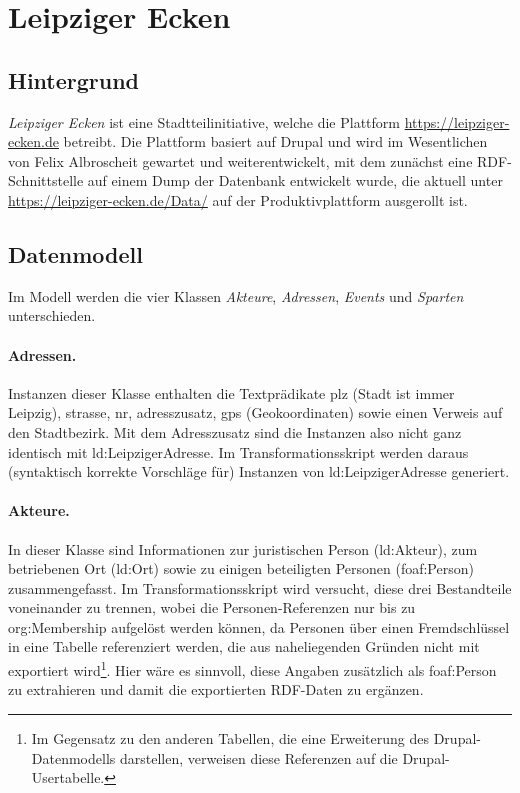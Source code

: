 \documentclass[a4paper,11pt]{article}
\begin{document}
\section{Leipziger Ecken}
\subsection{Hintergrund}

\emph{Leipziger Ecken} ist eine Stadtteilinitiative, welche die Plattform
\url{https://leipziger-ecken.de} betreibt. Die Plattform basiert auf Drupal
und wird im Wesentlichen von Felix Albroscheit gewartet und weiterentwickelt,
mit dem zunächst eine RDF-Schnittstelle auf einem Dump der Datenbank
entwickelt wurde, die aktuell unter \url{https://leipziger-ecken.de/Data/} auf
der Produktivplattform ausgerollt ist. 

\subsection{Datenmodell}

Im Modell werden die vier Klassen \emph{Akteure}, \emph{Adressen},
\emph{Events} und \emph{Sparten} unterschieden.

\paragraph{Adressen.}
Instanzen dieser Klasse enthalten die Textprädikate plz (Stadt ist immer
Leipzig), strasse, nr, adresszusatz, gps (Geokoordinaten) sowie einen Verweis
auf den Stadtbezirk.  Mit dem Adresszusatz sind die Instanzen also nicht ganz
identisch mit ld:LeipzigerAdresse. Im Transformationsskript werden daraus
(syntaktisch korrekte Vorschläge für) Instanzen von ld:LeipzigerAdresse
generiert.

\paragraph{Akteure.}
In dieser Klasse sind Informationen zur juristischen Person (ld:Akteur), zum
betriebenen Ort (ld:Ort) sowie zu einigen beteiligten Personen (foaf:Person)
zusammengefasst.  Im Transformationsskript wird versucht, diese drei
Bestandteile voneinander zu trennen, wobei die Personen-Referenzen nur bis zu
org:Membership aufgelöst werden können, da Personen über einen Fremdschlüssel
in eine Tabelle referenziert werden, die aus naheliegenden Gründen nicht mit
exportiert wird\footnote{Im Gegensatz zu den anderen Tabellen, die eine
  Erweiterung des Drupal-Datenmodells darstellen, verweisen diese Referenzen
  auf die Drupal-Usertabelle.}. Hier wäre es sinnvoll, diese Angaben
zusätzlich als foaf:Person zu extrahieren und damit die exportierten RDF-Daten
zu ergänzen.
\end{document}
